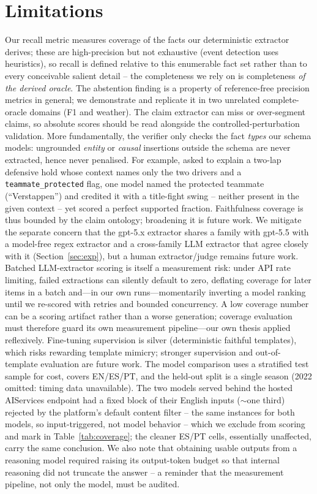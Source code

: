 \documentclass[11pt]{article}
\begin{document}
\section{Limitations}
Our recall metric measures coverage of the facts our deterministic extractor derives;
these are high-precision but not exhaustive (event detection uses heuristics), so recall
is defined relative to this enumerable fact set rather than to every conceivable salient
detail -- the completeness we rely on is completeness \emph{of the derived oracle}. The
abstention finding is a property of reference-free precision metrics in general; we
demonstrate and replicate it in two unrelated complete-oracle domains (F1 and weather).
The claim extractor can miss or over-segment claims, so absolute scores should be read
alongside the controlled-perturbation validation. More fundamentally, the verifier only
checks the fact \emph{types} our schema models: ungrounded \emph{entity} or \emph{causal}
insertions outside the schema are never extracted, hence never penalised. For example,
asked to explain a two-lap defensive hold whose context names only the two drivers and a
\texttt{teammate\_protected} flag, one model named the protected teammate
(``Verstappen'') and credited it with a title-fight swing -- neither present in the given
context -- yet scored a perfect supported fraction. Faithfulness coverage is thus bounded
by the claim ontology; broadening it is future work. We mitigate the separate concern that
the gpt-5.x extractor shares a family with gpt-5.5 with a model-free regex extractor and a
cross-family LLM extractor that agree closely with it (Section~\ref{sec:exp}), but a
human extractor/judge remains future work. Batched LLM-extractor scoring is itself a
measurement risk: under API rate limiting, failed extractions can silently default to
zero, deflating coverage for later items in a batch and---in our own runs---momentarily
inverting a model ranking until we re-scored with retries and bounded concurrency. A low
coverage number can be a scoring artifact rather than a worse generation; coverage
evaluation must therefore guard its own measurement pipeline---our own thesis applied
reflexively. Fine-tuning supervision is silver
(deterministic faithful templates), which risks rewarding template mimicry; stronger
supervision and out-of-template evaluation are future work. The model comparison uses a
stratified test sample for cost, covers EN/ES/PT, and the held-out split is a single
season (2022 omitted: timing data unavailable). The two models served behind the hosted
AIServices endpoint had a fixed block of their English inputs ($\sim$one third) rejected
by the platform's default content filter -- the same instances for both models, so
input-triggered, not model behavior -- which we exclude from scoring and mark in
Table~\ref{tab:coverage}; the cleaner ES/PT cells, essentially unaffected, carry the same
conclusion. We also note that obtaining usable outputs from a reasoning model required
raising its output-token budget so that internal reasoning did not truncate the answer --
a reminder that the measurement pipeline, not only the model, must be audited.
\end{document}
